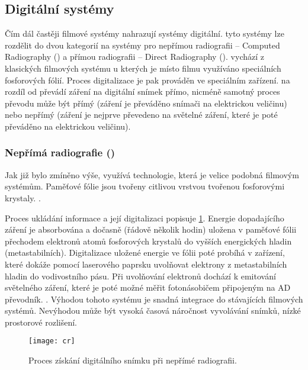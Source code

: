 \subsection{Digitální systémy}
Čím dál častěji filmové systémy nahrazují systémy digitální. tyto systémy lze rozdělit do dvou kategorií na systémy pro nepřímou radiografii -- Computed Radiography () a přímou radiografii -- Direct Radiography  ().  vychází z klasických filmových systému u kterých je místo filmu využíváno speciálních fosforových fólií. Proces digitalizace je pak prováděn ve speciálním zařízení.
 na rozdíl od  převádí záření na digitální snímek přímo, nicméně samotný proces převodu může být přímý (záření je převáděno snímači na elektrickou veličinu) nebo nepřímý (záření je nejprve převedeno na světelné záření, které je poté převáděno na elektrickou veličinu). \cite[str.~676]{Advances-in-Digital-Radiography}

\subsubsection{Nepřímá radiografie ()}
Jak již bylo zmíněno výše,  využívá technologie, která je velice podobná filmovým systémům. Paměťové fólie jsou tvořeny citlivou vrstvou tvořenou fosforovými krystaly. \cite[str.~676]{Advances-in-Digital-Radiography}. 

Proces ukládání informace a její digitalizaci popisuje \cref{fig:cr}. Energie dopadajícího záření je absorbována a dočasně (řádově několik hodin) uložena v paměťové fólii přechodem elektronů atomů fosforových krystalů do vyšších energických hladin (metastabilních). Digitalizace uložené energie ve fólii poté probíhá v zařízení, které dokáže pomocí laserového paprsku uvolňovat elektrony z metastabilních hladin do vodivostního pásu. Při uvolňování elektronů dochází k emitování světelného záření, které je poté možné měřit fotonásobičem připojeným na AD převodník. \cite[str.~677]{Advances-in-Digital-Radiography}. Výhodou tohoto systému je snadná integrace do stávajících filmových systémů. Nevýhodou může být vysoká časová náročnost vyvolávání snímků, nízké prostorové rozlišení. \cite[str~209]{Diagnostic-Radiology}

\begin{figure}[ht]
\centering
\texttt{[image: cr]}
\caption{Proces získání digitálního snímku při nepřímé radiografii. \cite[str.~677]{Advances-in-Digital-Radiography}}
\label{fig:cr}
\end{figure}

